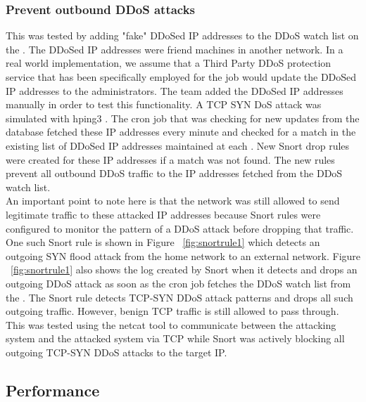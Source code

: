 \subsubsection{Prevent outbound DDoS attacks}
\label{sec:eval:outddos}

This was tested by adding "fake" DDoSed IP addresses to the DDoS watch list on the \servname. The DDoSed IP addresses were friend machines in another network. In a real world implementation, we assume that a Third Party DDoS protection service \cite{DDoSPreventionTools} that has been specifically employed for the job would update the DDoSed IP addresses to the \sysname administrators. The team added the DDoSed IP addresses manually in order to test this functionality. A TCP SYN DoS attack was simulated with hping3 \cite{hpingReferralPaper} \cite{hping}.  The cron job that was checking for new updates from the database fetched these IP addresses every minute and checked for a match in the existing list of DDoSed IP addresses maintained at each \nodename. New Snort drop rules were created for these IP addresses if a match was not found. The new rules prevent all outbound DDoS traffic to the IP addresses fetched from the DDoS watch list. \\

An important point to note here is that the network was still allowed to send legitimate traffic to these attacked IP addresses because Snort rules were configured to monitor the pattern of a DDoS attack before dropping that traffic. One such Snort rule is shown in Figure ~\ref{fig:snortrule1} which detects an outgoing SYN flood attack from the home network to an external network. Figure ~\ref{fig:snortrule1} also shows the log created by Snort when it detects and drops an outgoing DDoS attack as soon as the cron job fetches the DDoS watch list from the \servname. The Snort rule detects TCP-SYN DDoS attack patterns and drops all such outgoing traffic. However, benign TCP traffic is still allowed to pass through. This was tested using the netcat tool \cite{netcat} to communicate between the attacking system and the attacked system via TCP while Snort was actively blocking all outgoing TCP-SYN DDoS attacks to the target IP.

\subsection{Performance}
